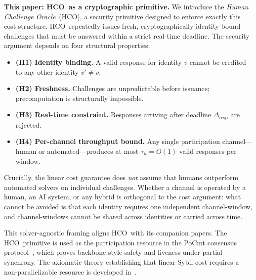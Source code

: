 \documentclass[11pt]{article}
\newcommand{\HCO}{HCO\xspace}
\theoremstyle{remark}
\theoremstyle{plain}
\begin{document}
	\noindent\textbf{This paper: \HCO\ as a cryptographic primitive.}
	We introduce the \emph{Human Challenge Oracle}~(\HCO), a security
	primitive designed to enforce exactly this cost structure. \HCO\
	repeatedly issues fresh, cryptographically identity-bound challenges
	that must be answered within a strict real-time deadline. The security
	argument depends on four structural properties:
	
	\begin{itemize}
		\item \textbf{(H1) Identity binding.} A valid response for identity
		$v$ cannot be credited to any other identity $v' \neq v$.
		\item \textbf{(H2) Freshness.} Challenges are unpredictable before
		issuance; precomputation is structurally impossible.
		\item \textbf{(H3) Real-time constraint.} Responses arriving after
		deadline $\Delta_{\mathrm{resp}}$ are rejected.
		\item \textbf{(H4) Per-channel throughput bound.} Any single
		participation channel---human or automated---produces at most
		$\tau_h = O(1)$ valid responses per window.
	\end{itemize}
	
	Crucially, the linear cost guarantee does \emph{not} assume that
	humans outperform automated solvers on individual challenges.
	Whether a channel is operated by a human, an AI system, or any hybrid
	is orthogonal to the cost argument: what cannot be avoided is that each
	identity requires one independent channel-window, and channel-windows
	cannot be shared across identities or carried across time.
	
	This solver-agnostic framing aligns \HCO\ with its companion papers.
	The \HCO\ primitive is used as the participation resource in the
	PoCmt consensus protocol~\cite{maleki2026pocmt}, which proves
	backbone-style safety and liveness under partial synchrony. The
	axiomatic theory establishing that linear Sybil cost requires a
	non-parallelizable resource is developed in~\cite{maleki2026geometry}.
	
\end{document}
